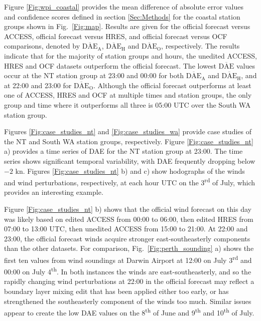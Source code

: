 \documentclass[twocol]{ametsoc}
\begin{document}
Figure \ref{Fig:wpi_coastal} provides the mean difference of absolute error values and confidence scores defined in section \ref{Sec:Methods} for the coastal station groups shown in Fig.~\ref{Fig:map}. Results are given for the official forecast versus ACCESS, official forecast versus HRES, and official forecast versus OCF comparisons, denoted by $\overline{\text{DAE}}_\text{A}$, $\overline{\text{DAE}}_\text{H}$ and $\overline{\text{DAE}}_\text{O}$, respectively. The results indicate that for the majority of station groups and hours, the unedited ACCESS, HRES and OCF datasets outperform the official forecast. The lowest $\overline{\text{DAE}}$ values occur at the NT station group at 23:00 and 00:00 for both $\overline{\text{DAE}}_\text{A}$ and $\overline{\text{DAE}}_\text{H}$, and at 22:00 and 23:00 for $\overline{\text{DAE}}_\text{O}$. Although the official forecast outperforms at least one of ACCESS, HRES and OCF at multiple times and station groups, the only group and time where it outperforms all three is 05:00 UTC over the South WA station group.

Figures \ref{Fig:case_studies_nt} and \ref{Fig:case_studies_wa} provide case studies of the NT and South WA station groups, respectively. Figure \ref{Fig:case_studies_nt} a) provides a time series of DAE for the NT station group at 23:00. The time series shows significant temporal variability, with DAE frequently dropping below $-2$ kn. Figures \ref{Fig:case_studies_nt} b) and c) show hodographs of the winds and wind perturbations, respectively, at each hour UTC on the 3\textsuperscript{rd} of July, which provides an interesting example. 

Figure \ref{Fig:case_studies_nt} b) shows that the official wind forecast on this day was likely based on edited ACCESS from 00:00 to 06:00, then edited HRES from 07:00 to 13:00 UTC, then unedited ACCESS from 15:00 to 21:00. At 22:00 and 23:00, the official forecast winds acquire stronger east-southeasterly components than the other datasets. For comparison, Fig.~\ref{Fig:perth_sounding} a) shows the first ten values from wind soundings at Darwin Airport at 12:00 on July 3\textsuperscript{rd} and 00:00 on July 4\textsuperscript{th}. In both instances the winds are east-southeasterly, and so the rapidly changing wind perturbations at 22:00 in the official forecast may reflect a boundary layer mixing edit that has been applied either too early, or has strengthened the southeasterly component of the winds too much. Similar issues appear to create the low DAE values on the 8\textsuperscript{th} of June and 9\textsuperscript{th} and 10\textsuperscript{th} of July.
\end{document}
